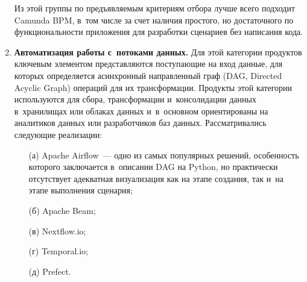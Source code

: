 \begin{multicols}{2}
\begin{enumerate}[1.]
        Из этой группы по предъявляемым критериям отбора лучше всего 
подходит Camunda BPM, в~том чис\-ле за счет наличия простого, но достаточного 
по функциональности приложения для разработки сценариев без написания кода.
\item \textbf{Автоматизация работы с~потоками данных.} Для этой категории 
продуктов ключевым элементом пред\-став\-ля\-ют\-ся по\-сту\-па\-ющие на вход данные, 
для которых определяется асинхронный на\-прав\-лен\-ный граф (DAG, Directed Acyclic Graph) операций для 
их трансформации. Продукты этой категории используются для сбора, 
трансформации и~консолидации данных в~хранилищах или облаках данных 
и~в~основном ориентированы на аналитиков данных или разработчиков баз 
данных. Рассматривались сле\-ду\-ющие реализации:
     \begin{itemize}
\item[(а)] Apache Airflow~--- одно из самых популярных решений, 
особенность которого заключается в~описании DAG на Python, но 
практически отсутствует адекватная визуализация как на этапе создания, так и~на этапе
выполнения сценария;
\item[(б)] Apache Beam;
\item[(в)] Nextflow.io;
\item[(г)] Temporal.io;
\item[(д)] Prefect.
\end{itemize}
        

\end{enumerate}
\end{multicols}
